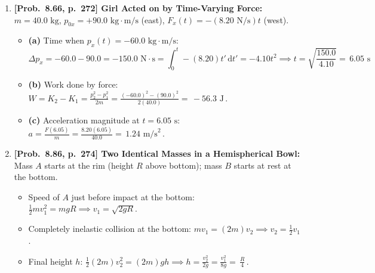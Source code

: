 \documentclass[11pt,a4paper,openany,oneside]{book}
\newcommand{\eqbox}[1]{\boxed{\,#1\,}}
\newcommand{\dd}{\,\mathrm{d}}
\numberwithin{equation}{chapter}
\begin{document}
\begin{enumerate}[label=\textbf{Prob.\ \arabic*},leftmargin=4.2em]
\begin{itemize}
\begin{equation*}
    \end{equation*}
    \item \textbf{(e)--(f)} If released at $x_1 = \frac{3\alpha}{\beta} = 3x_0$, then $E = U(3x_0) = -\frac{2\alpha}{9x_0^2} < 0$. Setting $U(x) = E$ gives $\left(\frac{x_0}{x}\right)^2 - \frac{x_0}{x} + \frac{2}{9} = \left(\frac{x_0}{x} - \frac{1}{3}\right)\!\left(\frac{x_0}{x} - \frac{2}{3}\right) = 0$. Thus the proton oscillates periodically between $x_{\min} = \eqbox{\frac{3}{2}x_0 = \frac{3\alpha}{2\beta}}$ and $x_{\max} = \eqbox{3x_0 = \frac{3\alpha}{\beta}}$. For release at $x_0$, $x_{\min} = x_0$ and $x_{\max} = \infty$.
  \end{itemize}

  \item \textbf{[Prob.\ 8.66, p.\ 272] Girl Acted on by Time-Varying Force:} $m = 40.0\text{ kg}$, $p_{0x} = +90.0\text{ kg}\cdot\text{m/s}$ (east), $F_x(t) = -(8.20\text{ N/s})t$ (west).
  \begin{itemize}
    \item \textbf{(a)} Time when $p_x(t) = -60.0\text{ kg}\cdot\text{m/s}$:
    \begin{equation*}
      \Delta p_x = -60.0 - 90.0 = -150.0\text{ N}\cdot\text{s} = \int_0^t -(8.20)t'\dd t' = -4.10t^2 \implies t = \sqrt{\frac{150.0}{4.10}} = \eqbox{6.05\text{ s}}
    \end{equation*}
    \item \textbf{(b)} Work done by force: $W = K_2 - K_1 = \frac{p_2^2 - p_1^2}{2m} = \frac{(-60.0)^2 - (90.0)^2}{2(40.0)} = \eqbox{-56.3\text{ J}}$.
    \item \textbf{(c)} Acceleration magnitude at $t = 6.05\text{ s}$: $a = \frac{F(6.05)}{m} = \frac{8.20(6.05)}{40.0} = \eqbox{1.24\text{ m/s}^2}$.
  \end{itemize}

  \item \textbf{[Prob.\ 8.86, p.\ 274] Two Identical Masses in a Hemispherical Bowl:}
  Mass $A$ starts at the rim (height $R$ above bottom); mass $B$ starts at rest at the bottom.
  \begin{itemize}
    \item Speed of $A$ just before impact at the bottom: $\frac{1}{2}mv_1^2 = mgR \implies v_1 = \sqrt{2gR}$.
    \item Completely inelastic collision at the bottom: $mv_1 = (2m)v_2 \implies v_2 = \frac{1}{2}v_1$.
    \item Final height $h$: $\frac{1}{2}(2m)v_2^2 = (2m)gh \implies h = \frac{v_2^2}{2g} = \frac{v_1^2}{8g} = \eqbox{\frac{R}{4}}$.
  \end{itemize}


\end{enumerate}
\end{document}

